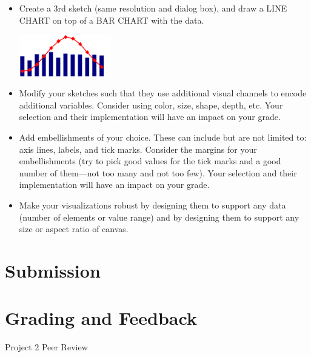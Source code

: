 \documentclass[a4paper,12pt]{article}
\begin{document}
\begin{itemize}
\item Create a 3rd sketch (same resolution and dialog box), and draw a LINE CHART on top of a BAR CHART with the data.

\begin{center}
\includegraphics[width=4cm]{images/bar_and_line_chart.png}
\end{center}


\item Modify your sketches such that they use additional visual channels to encode additional variables. Consider using color, size, shape, depth, etc. Your selection and their implementation will have an impact on your grade.

\item Add embellishments of your choice. These can include but are not limited to: axis lines, labels, and tick marks. Consider the margins for your embellishments (try to pick good values for the tick marks and a good number of them---not too many and not too few). Your selection and their implementation will have an impact on your grade.

\item Make your visualizations robust by designing them to support any data (number of elements or value range) and by designing them to support any size or aspect ratio of canvas.

\end{itemize}


\section{Submission}


\section{Grading and Feedback}

\feedback




\newpage


\begin{center}
{\huge Project 2 Peer Review}
\end{center}
\end{document}
